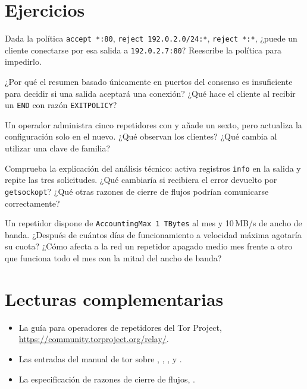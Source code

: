\section*{Ejercicios}

\begin{esercizio}[1]\label{es:22-ordine}
Dada la política \texttt{accept *:80}, \texttt{reject 192.0.2.0/24:*}, \texttt{reject *:*}, ¿puede un cliente conectarse por esa salida a \texttt{192.0.2.7:80}? Reescribe la política para impedirlo.
\end{esercizio}

\begin{esercizio}[1]\label{es:22-riassunto}
¿Por qué el resumen basado únicamente en puertos del consenso es insuficiente para decidir si una salida aceptará una conexión? ¿Qué hace el cliente al recibir un \texttt{END} con razón \texttt{EXITPOLICY}?
\end{esercizio}

\begin{esercizio}[2]\label{es:22-famiglia}
Un operador administra cinco repetidores con  y añade un sexto, pero actualiza la configuración solo en el nuevo. ¿Qué observan los clientes? ¿Qué cambia al utilizar una clave de familia?
\end{esercizio}

\begin{esercizio}[2]\label{es:22-refused}
Comprueba la explicación del análisis técnico: activa registros \texttt{info} en la salida y repite las tres solicitudes. ¿Qué cambiaría si  recibiera el error devuelto por \texttt{getsockopt}? ¿Qué otras razones de cierre de flujos podrían comunicarse correctamente?
\end{esercizio}

\begin{esercizio}[3]\label{es:22-accounting}
Un repetidor dispone de \texttt{AccountingMax 1 TBytes} al mes y 10\,MB/s de ancho de banda. ¿Después de cuántos días de funcionamiento a velocidad máxima agotaría su cuota? ¿Cómo afecta a la red un repetidor apagado medio mes frente a otro que funciona todo el mes con la mitad del ancho de banda?
\end{esercizio}

\section*{Lecturas complementarias}
\begin{itemize}
  \item La guía para operadores de repetidores del Tor Project, \url{https://community.torproject.org/relay/}.
  \item \begin{sloppypar}Las entradas del manual de tor sobre , ,
        ,  y .\end{sloppypar}
  \item La especificación de razones de cierre de flujos, .
\end{itemize}
